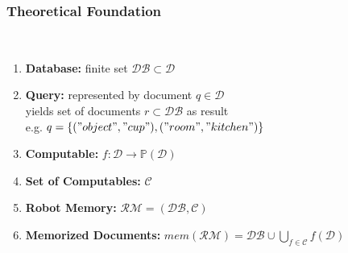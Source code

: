 \begin{frame}
  \frametitle{Theoretical Foundation}
  \begin{description}[]
  \item[Definition Robot Memory] \hfill \\
    \begin{enumerate}
      \item \textbf{Database:} finite set $\mathcal{DB} \subset \mathcal{D}$
      \item \textbf{Query:} represented by document $q\in\mathcal{D}$\\
      yields set of documents $r\subset\mathcal{DB}$ as result\\
      e.g. $q=\{("object","cup"),("room","kitchen")\}$
      \item \textbf{Computable:} $f: \mathcal{D} \rightarrow \mathbb{P}(\mathcal{D})$
      \item \textbf{Set of Computables:} $\mathcal{C}$
      \item \textbf{Robot Memory:} $\mathcal{RM}=(\mathcal{DB},\mathcal{C})$
      \item \textbf{Memorized Documents:} $mem(\mathcal{RM})=\mathcal{DB} \cup \bigcup_{f\in\mathcal{C}}f(\mathcal{D})$
    \end{enumerate}
  \end{description}  
\end{frame}

